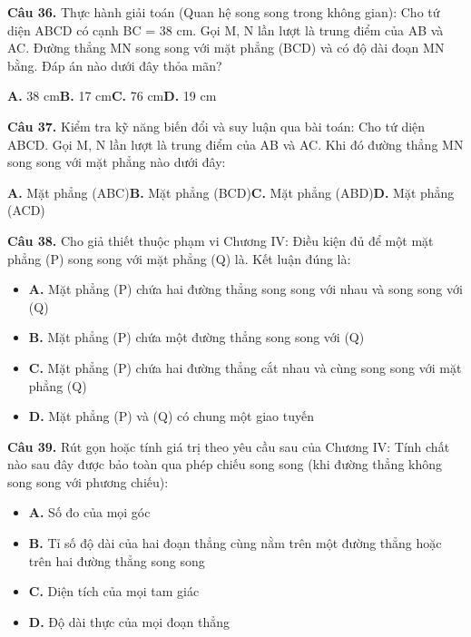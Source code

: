 \documentclass[11pt,a4paper]{article}
\begin{document}
\textbf{\color{primary} Câu 36.} Thực hành giải toán (Quan hệ song song trong không gian): Cho tứ diện ABCD có cạnh BC = 38 cm. Gọi M, N lần lượt là trung điểm của AB và AC. Đường thẳng MN song song với mặt phẳng (BCD) và có độ dài đoạn MN bằng. Đáp án nào dưới đây thỏa mãn?\par
\hspace*{1.5em}\textbf{A.} 38 cm\quad\quad \textbf{B.} 17 cm\quad\quad \textbf{C.} 76 cm\quad\quad \textbf{D.} 19 cm\par\vspace{2pt}
\textbf{\color{primary} Câu 37.} Kiểm tra kỹ năng biến đổi và suy luận qua bài toán: Cho tứ diện ABCD. Gọi M, N lần lượt là trung điểm của AB và AC. Khi đó đường thẳng MN song song với mặt phẳng nào dưới đây:\par
\hspace*{1.5em}\textbf{A.} Mặt phẳng (ABC)\quad\quad \textbf{B.} Mặt phẳng (BCD)\quad\quad \textbf{C.} Mặt phẳng (ABD)\quad\quad \textbf{D.} Mặt phẳng (ACD)\par\vspace{2pt}
\textbf{\color{primary} Câu 38.} Cho giả thiết thuộc phạm vi Chương IV: Điều kiện đủ để một mặt phẳng (P) song song với mặt phẳng (Q) là. Kết luận đúng là:\par
\begin{itemize}\setlength{\itemsep}{1pt}\setlength{\parskip}{0pt}
  \item[] \textbf{A.} Mặt phẳng (P) chứa hai đường thẳng song song với nhau và song song với (Q)
  \item[] \textbf{B.} Mặt phẳng (P) chứa một đường thẳng song song với (Q)
  \item[] \textbf{C.} Mặt phẳng (P) chứa hai đường thẳng cắt nhau và cùng song song với mặt phẳng (Q)
  \item[] \textbf{D.} Mặt phẳng (P) và (Q) có chung một giao tuyến
\end{itemize}\vspace{2pt}
\textbf{\color{primary} Câu 39.} Rút gọn hoặc tính giá trị theo yêu cầu sau của Chương IV: Tính chất nào sau đây được bảo toàn qua phép chiếu song song (khi đường thẳng không song song với phương chiếu):\par
\begin{itemize}\setlength{\itemsep}{1pt}\setlength{\parskip}{0pt}
  \item[] \textbf{A.} Số đo của mọi góc
  \item[] \textbf{B.} Tỉ số độ dài của hai đoạn thẳng cùng nằm trên một đường thẳng hoặc trên hai đường thẳng song song
  \item[] \textbf{C.} Diện tích của mọi tam giác
  \item[] \textbf{D.} Độ dài thực của mọi đoạn thẳng
\end{itemize}\vspace{2pt}
\end{document}
